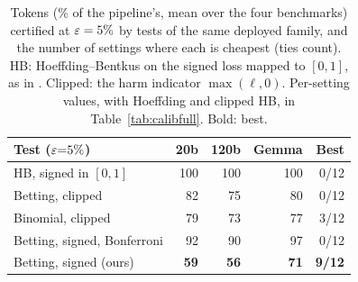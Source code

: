 \begin{table}[t]
\centering
\small
\setlength{\tabcolsep}{4pt}
\begin{tabular}{@{}lrrrr@{}}
\toprule
Test ($\varepsilon{=}5\%$) & 20b & 120b & Gemma & Best \\
\midrule
HB, signed in $[0,1]$ & 100 & 100 & 100 & 0/12 \\
Betting, clipped & 82 & 75 & 80 & 0/12 \\
Binomial, clipped & 79 & 73 & 77 & 3/12 \\
Betting, signed, Bonferroni & 92 & 90 & 97 & 0/12 \\
\midrule
Betting, signed (ours) & \textbf{59} & \textbf{56} & \textbf{71} & \textbf{9/12} \\
\bottomrule
\end{tabular}
\caption{Tokens (\% of the pipeline's, mean over the four benchmarks) certified at $\varepsilon = 5\%$ by tests of
the same deployed family, and the number of settings where each is cheapest (ties count). HB: Hoeffding--Bentkus
on the signed loss mapped to $[0, 1]$, as in \citet{wynn2026corrupted}. Clipped: the harm indicator
$\max(\ell, 0)$. Per-setting values, with Hoeffding and clipped HB, in Table~\ref{tab:calibfull}. Bold: best.}
\label{tab:calib}
\end{table}

